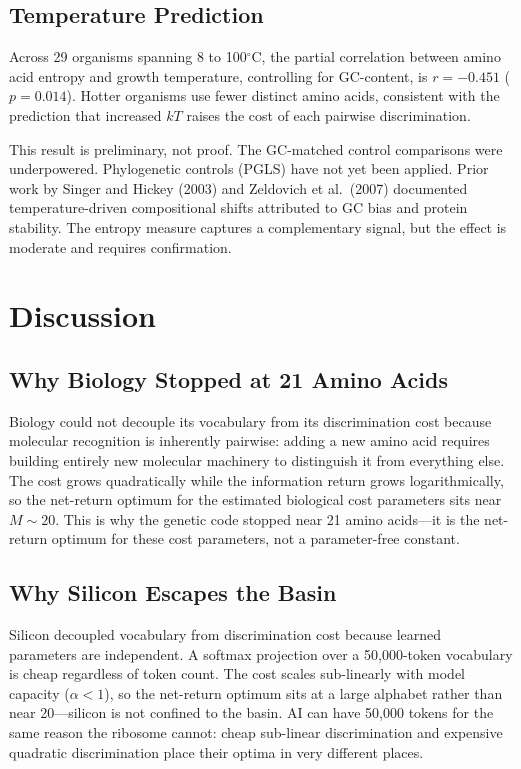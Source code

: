 \documentclass[11pt]{article}
\begin{document}
\subsection{Temperature Prediction}

Across 29 organisms spanning 8 to 100$^\circ$C, the partial correlation between amino acid entropy and growth temperature, controlling for GC-content, is $r = -0.451$ ($p = 0.014$). Hotter organisms use fewer distinct amino acids, consistent with the prediction that increased $kT$ raises the cost of each pairwise discrimination.

This result is preliminary, not proof. The GC-matched control comparisons were underpowered. Phylogenetic controls (PGLS) have not yet been applied. Prior work by Singer and Hickey (2003) and Zeldovich et al.\ (2007) documented temperature-driven compositional shifts attributed to GC bias and protein stability. The entropy measure captures a complementary signal, but the effect is moderate and requires confirmation.

\section{Discussion}

\subsection{Why Biology Stopped at 21 Amino Acids}

Biology could not decouple its vocabulary from its discrimination cost because molecular recognition is inherently pairwise: adding a new amino acid requires building entirely new molecular machinery to distinguish it from everything else. The cost grows quadratically while the information return grows logarithmically, so the net-return optimum for the estimated biological cost parameters sits near $M \sim 20$. This is why the genetic code stopped near 21 amino acids---it is the net-return optimum for these cost parameters, not a parameter-free constant.

\subsection{Why Silicon Escapes the Basin}

Silicon decoupled vocabulary from discrimination cost because learned parameters are independent. A softmax projection over a 50,000-token vocabulary is cheap regardless of token count. The cost scales sub-linearly with model capacity ($\alpha < 1$), so the net-return optimum sits at a large alphabet rather than near 20---silicon is not confined to the basin. AI can have 50,000 tokens for the same reason the ribosome cannot: cheap sub-linear discrimination and expensive quadratic discrimination place their optima in very different places.
\end{document}
